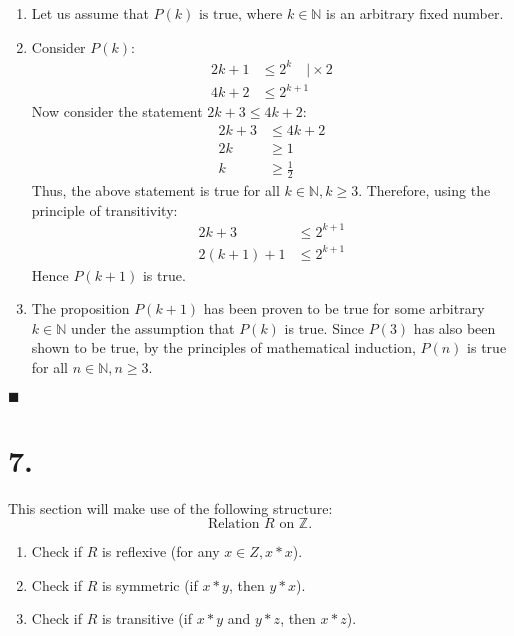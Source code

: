 \documentclass[12pt]{article}
\newcommand{\q}{\hfill $\blacksquare$}
\newenvironment{ps}
{\begin{enumerate}[leftmargin=0em, itemindent=1.5em]}
{\end{enumerate}}
\begin{document}
\begin{ps}
\begin{enumerate}[label=\arabic*.]
    \item Let us assume that \( P(k) \text{ is true, where } k \in \mathbb{N} \) is an arbitrary
        fixed number.

    \item Consider \( P(k) \):
    \begin{align*}
        2k + 1 &\leq 2^k \quad \biggr| \times 2 \\
        4k + 2 &\leq 2^{k+1}
    \end{align*}
    Now consider the statement \( 2k+3 \leq 4k + 2 \):
    \begin{align*}
        2k + 3 &\leq 4k + 2 \\
        2k &\geq 1 \\
        k &\geq \frac{1}{2}
    \end{align*}
    Thus, the above statement is true for all \( k \in \mathbb{N}, k \geq 3 \).
    Therefore, using the principle of transitivity:
    \begin{align*}
        2k+3 &\leq 2^{k+1} \\
        2(k+1) + 1 &\leq 2^{k+1}
    \end{align*}
    Hence \( P(k+1) \) is true.

    \item The proposition \( P(k+1) \) has been proven to be true for some arbitrary \( k \in
        \mathbb{N} \) under the assumption that \( P(k) \) is true. Since \( P(3) \) has also been
        shown to be true, by the principles of mathematical induction, \( P(n) \) is true for all \( n \in
        \mathbb{N}, n \geq 3 \).

    \end{enumerate} \q

\end{ps}

\section*{7.}
This section will make use of the following structure:
\[
    \text{Relation } R \text{ on } \mathbb{Z}.
\]   
\begin{enumerate}

    \item Check if \( R \) is reflexive (for any \(x \in Z, x*x \)).
    \item Check if \( R \) is symmetric (if \( x*y \), then \( y*x \)).
    \item Check if \( R \) is transitive (if \( x*y \) and \( y*z \), then \( x*z \)).

\end{enumerate}
\end{document}
